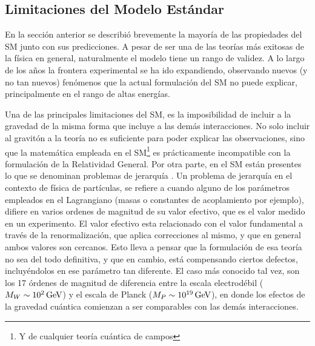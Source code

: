 \subsection{Limitaciones del Modelo Estándar}

En la sección anterior se describió brevemente la mayoría de las propiedades del SM junto con sus predicciones. A pesar de ser una de las teorías más exitosas de la 
física en general,
naturalmente el modelo tiene un rango de validez. A lo largo de los años la frontera experimental se ha ido expandiendo, observando nuevos (y no tan nuevos) fenómenos que la actual formulación del SM no puede explicar, principalmente en el rango de altas energías.

Una de las principales limitaciones del SM, es la imposibilidad de incluir a la gravedad de la misma forma que incluye a las demás interacciones. No solo incluir al gravitón a la teoría no es suficiente para poder explicar las observaciones, sino que la matemática empleada en el SM\footnote{Y de cualquier teoría cuántica de campos} es prácticamente incompatible con la formulación de la Relatividad General. Por otra parte, en el SM están presentes lo que se denominan problemas de jerarquía \cite{hierarchy}. 
Un problema de jerarquía en el contexto de física de partículas, se refiere a cuando alguno de los parámetros empleados en el Lagrangiano (masas o constantes de acoplamiento por ejemplo), difiere en varios ordenes de magnitud de su valor efectivo, que es el valor medido en un experimento. El valor efectivo esta relacionado con el valor fundamental a través de la renormalización, que aplica correcciones al mismo, y que en general ambos valores son cercanos.
Esto lleva a pensar que la formulación de esa teoría no sea del todo definitiva, y que en cambio, está compensando ciertos defectos, incluyéndolos en ese parámetro tan diferente. 
El caso más conocido tal vez, son los 17 órdenes de magnitud de diferencia entre la escala electrodébil ($M_W\sim 10^{2}\,\text{GeV}$) y el escala de Planck ($M_P\sim 10^{19}\,\text{GeV}$), en donde los efectos de la gravedad cuántica comienzan a ser comparables con las demás interacciones.


